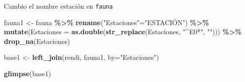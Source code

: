 \documentclass[
]{article}
\newenvironment{Shaded}{\begin{snugshade}}{\end{snugshade}}
\newcommand{\AttributeTok}[1]{\textcolor[rgb]{0.13,0.29,0.53}{#1}}
\newcommand{\FunctionTok}[1]{\textcolor[rgb]{0.13,0.29,0.53}{\textbf{#1}}}
\newcommand{\NormalTok}[1]{#1}
\newcommand{\OtherTok}[1]{\textcolor[rgb]{0.56,0.35,0.01}{#1}}
\newcommand{\SpecialCharTok}[1]{\textcolor[rgb]{0.81,0.36,0.00}{\textbf{#1}}}
\newcommand{\StringTok}[1]{\textcolor[rgb]{0.31,0.60,0.02}{#1}}
\begin{document}
Cambio el nombre estación en \texttt{fauna}

\begin{Shaded}
\begin{Highlighting}[]
\NormalTok{fauna1 }\OtherTok{\textless{}{-}}\NormalTok{ fauna }\SpecialCharTok{\%\textgreater{}\%} 
  \FunctionTok{rename}\NormalTok{(}\StringTok{"Estaciones"}\OtherTok{=}\StringTok{"ESTACIÓN"}\NormalTok{) }\SpecialCharTok{\%\textgreater{}\%} 
  \FunctionTok{mutate}\NormalTok{(}\AttributeTok{Estaciones =} \FunctionTok{as.double}\NormalTok{(}\FunctionTok{str\_replace}\NormalTok{(Estaciones, }\StringTok{"\^{}E0*"}\NormalTok{, }\StringTok{""}\NormalTok{))) }\SpecialCharTok{\%\textgreater{}\%} 
  \FunctionTok{drop\_na}\NormalTok{(Estaciones)}
\end{Highlighting}
\end{Shaded}

\begin{Shaded}
\begin{Highlighting}[]
\NormalTok{base1  }\OtherTok{\textless{}{-}} \FunctionTok{left\_join}\NormalTok{(rendi, fauna1,}
                   \AttributeTok{by=}\StringTok{"Estaciones"}\NormalTok{)}
\end{Highlighting}
\end{Shaded}

\begin{Shaded}
\begin{Highlighting}[]
\FunctionTok{glimpse}\NormalTok{(base1)}
\end{Highlighting}
\end{Shaded}
\end{document}

